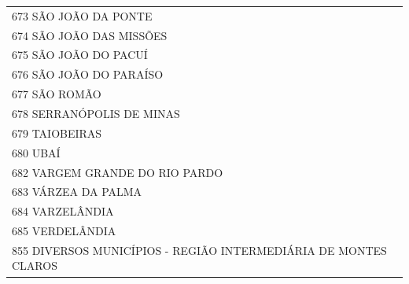 \documentclass{article}
\begin{document}
\begin{longtable}[c]{m{18cm}}
\multicolumn{1}{l}{ \hspace{2em} 673 SÃO JOÃO DA PONTE } \\
\multicolumn{1}{l}{ \hspace{2em} 674 SÃO JOÃO DAS MISSÕES } \\
\multicolumn{1}{l}{ \hspace{2em} 675 SÃO JOÃO DO PACUÍ } \\
\multicolumn{1}{l}{ \hspace{2em} 676 SÃO JOÃO DO PARAÍSO } \\
\multicolumn{1}{l}{ \hspace{2em} 677 SÃO ROMÃO } \\
\multicolumn{1}{l}{ \hspace{2em} 678 SERRANÓPOLIS DE MINAS } \\
\multicolumn{1}{l}{ \hspace{2em} 679 TAIOBEIRAS } \\
\multicolumn{1}{l}{ \hspace{2em} 680 UBAÍ } \\
\multicolumn{1}{l}{ \hspace{2em} 682 VARGEM GRANDE DO RIO PARDO } \\
\multicolumn{1}{l}{ \hspace{2em} 683 VÁRZEA DA PALMA } \\
\multicolumn{1}{l}{ \hspace{2em} 684 VARZELÂNDIA } \\
\multicolumn{1}{l}{ \hspace{2em} 685 VERDELÂNDIA } \\
\multicolumn{1}{l}{ \hspace{2em} 855 DIVERSOS MUNICÍPIOS - REGIÃO INTERMEDIÁRIA DE MONTES CLAROS } \\
\end{longtable}
\newpage
\end{document}
